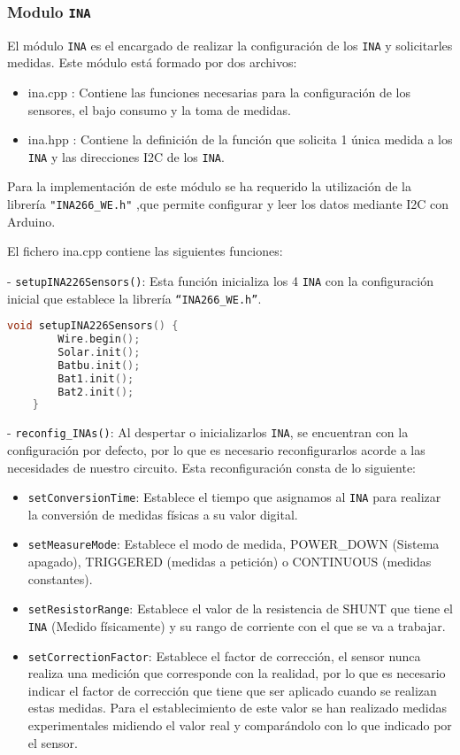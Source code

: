 \subsubsection{Modulo \texttt{INA}}

El módulo \texttt{INA} es el encargado de realizar la configuración de los \texttt{INA} y solicitarles medidas.
Este módulo está formado por dos archivos:
\begin{itemize}
    \item ina.cpp : Contiene las funciones necesarias para la configuración de los sensores, el bajo consumo y la toma de medidas.
    \item ina.hpp : Contiene la definición de la función que solicita 1 única medida a los \texttt{INA} y las direcciones I2C de los \texttt{INA}.
\end{itemize}

Para la implementación de este módulo se ha requerido la utilización de la librería \texttt{"INA266\_WE.h"} ,que permite configurar y leer los datos mediante I2C con Arduino.\cite{ewaldWollewaldINA226_WE2024}

El fichero ina.cpp contiene las siguientes funciones:

- \texttt{setupINA226Sensors()}: Esta función inicializa los 4 \texttt{INA} con la configuración inicial que establece la librería \texttt{“INA266\_WE.h”}.

\begin{lstlisting}[captionpos=b, caption={Codigo funcion setupINA226Sensors}, language=c++]
    void setupINA226Sensors() {
        Wire.begin();
        Solar.init();
        Batbu.init();
        Bat1.init();
        Bat2.init();
    }
\end{lstlisting}

- \texttt{reconfig\_INAs()}: Al despertar o inicializarlos \texttt{INA}, se encuentran con la configuración por defecto, por lo que es necesario reconfigurarlos acorde a las necesidades de nuestro circuito. Esta reconfiguración consta de lo siguiente:
\begin{itemize}
    \item \texttt{setConversionTime}: Establece el tiempo que asignamos al \texttt{INA} para realizar la conversión de medidas físicas a su valor digital.
    \item \texttt{setMeasureMode}: Establece el modo de medida, POWER\_DOWN (Sistema apagado), TRIGGERED (medidas a petición) o CONTINUOUS (medidas constantes).
    \item \texttt{setResistorRange}: Establece el valor de la resistencia de SHUNT que tiene el \texttt{INA} (Medido físicamente) y su rango de corriente con el que se va a trabajar.
    \item \texttt{setCorrectionFactor}: Establece el factor de corrección, el sensor nunca realiza una medición que corresponde con la realidad, por lo que es necesario indicar el factor de corrección que tiene que ser aplicado cuando se realizan estas medidas. Para el establecimiento de este valor se han realizado medidas experimentales midiendo el valor real y comparándolo con lo que indicado por el sensor.
\end{itemize}


